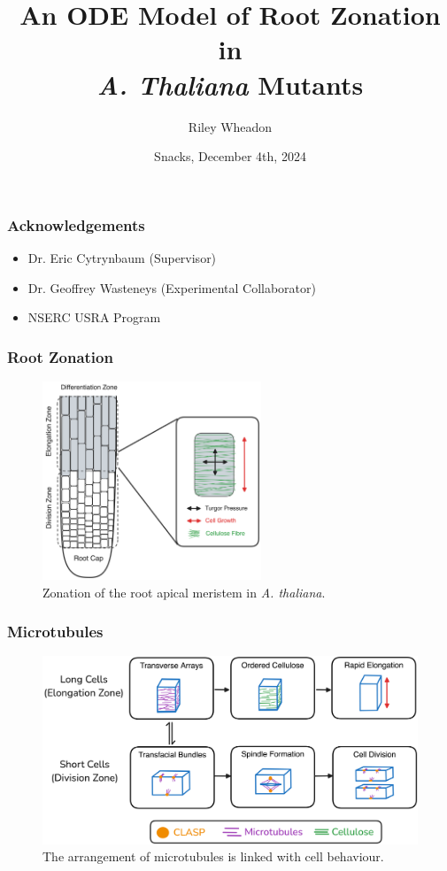 \documentclass{beamer}
\title{An ODE Model of Root Zonation in \\ \emph{A. Thaliana} Mutants}
\author{Riley Wheadon}
\institute{University of British Columbia}
\date{Snacks, December 4th, 2024}
\begin{document}
\frame{\titlepage}

\begin{frame}
\frametitle{Acknowledgements}
\begin{itemize}
  \item Dr. Eric Cytrynbaum (Supervisor)
  \item Dr. Geoffrey Wasteneys (Experimental Collaborator)
  \item NSERC USRA Program
\end{itemize}
\end{frame}

\begin{frame}
\frametitle{Root Zonation}
\begin{figure}
  \centering
  \includegraphics[height=16em]{root-zonation-simple.png}
  \caption{Zonation of the root apical meristem in \emph{A. thaliana}.}
\end{figure}
\end{frame}

\begin{frame}
\frametitle{Microtubules}
\begin{figure}
  \centering
  \includegraphics[width=\textwidth]{microtubule-behaviour.png}
  \caption{The arrangement of microtubules is linked with cell behaviour.}
\end{figure}
\end{frame}
\end{document}
